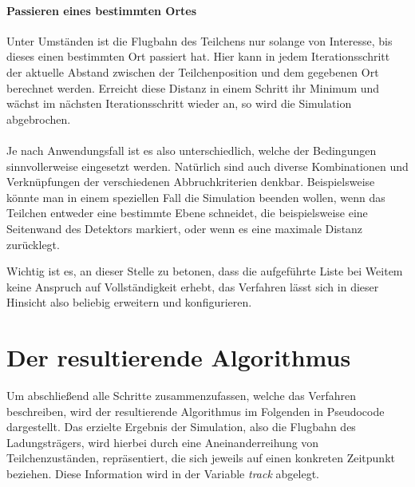 \paragraph{Passieren eines bestimmten Ortes}
Unter Umst\"anden ist die Flugbahn des Teilchens nur solange von Interesse, bis dieses einen bestimmten Ort passiert hat. Hier
kann in jedem Iterationsschritt der aktuelle Abstand zwischen der Teilchenposition und dem gegebenen Ort berechnet werden.
Erreicht diese Distanz in einem Schritt ihr Minimum und w\"achst im n\"achsten Iterationsschritt wieder an, so wird die
Simulation abgebrochen.
\\
\\
Je nach Anwendungsfall ist es also unterschiedlich, welche der Bedingungen sinnvollerweise eingesetzt werden. Nat\"urlich sind
auch diverse Kombinationen und Verkn\"upfungen der verschiedenen Abbruchkriterien denkbar. Beispielsweise k\"onnte man in einem
speziellen Fall die Simulation beenden wollen, wenn das Teilchen entweder eine bestimmte Ebene schneidet, die beispielsweise eine
Seitenwand des Detektors markiert, oder wenn es eine maximale Distanz zur\"ucklegt.

Wichtig ist es, an dieser Stelle zu betonen, dass die aufgef\"uhrte Liste bei Weitem keine Anspruch auf Vollst\"andigkeit erhebt,
das Verfahren l\"asst sich in dieser Hinsicht also beliebig erweitern und konfigurieren.

\section{Der resultierende Algorithmus}

Um abschlie{\ss}end alle Schritte zusammenzufassen, welche das Verfahren beschreiben, wird der resultierende Algorithmus im Folgenden
in Pseudocode dargestellt. Das erzielte Ergebnis der Simulation, also die Flugbahn des Ladungstr\"agers, wird hierbei durch eine
Aneinanderreihung von Teilchenzust\"anden, repr\"asentiert, die sich jeweils auf einen konkreten Zeitpunkt beziehen. Diese
Information wird in der Variable \textit{track} abgelegt.

